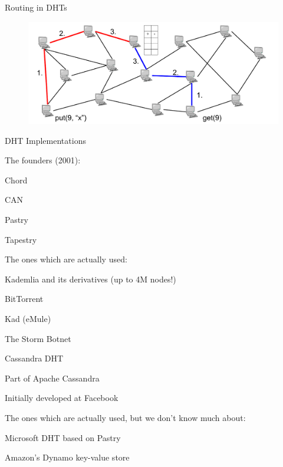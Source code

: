 \begin{frame}{Routing in DHTs}

\begin{figure}
	\includegraphics[width=\textwidth]{dht-routing}
\end{figure}

\end{frame}

\begin{frame}{DHT Implementations}
	
\BIL
\item The founders (2001):
	\BI
	\item \alert{Chord}
	\item \alert{CAN}
	\item Pastry
	\item Tapestry
	\EI
\item The ones which are actually used:
	\BI
	\item \alert{Kademlia} and its derivatives (up to 4M nodes!)
		\BI
		\item BitTorrent
		\item Kad (eMule)
		\item The Storm Botnet
		\EI
	\item \alert{Cassandra} DHT
		\BI
		\item Part of Apache Cassandra
		\item Initially developed at Facebook
		\EI
	\EI
\item The ones which are actually used, but we don't know much about:
\BI
\item Microsoft DHT based on Pastry
\item Amazon's Dynamo key-value store
\EI
\EIL
\end{frame}

